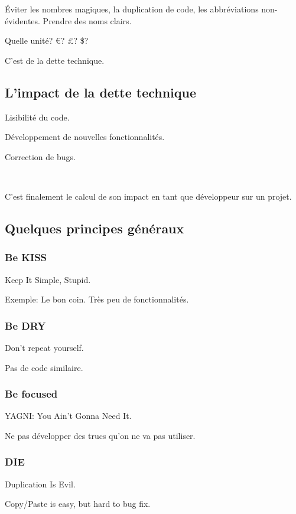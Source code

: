 \documentclass[a4paper,11pt]{article}
\begin{document}
Éviter les nombres magiques, la duplication de code, les abbréviations
non-évidentes. Prendre des noms clairs.

Quelle unité? \euro? £? \$?

C'est de la dette technique.

\subsection{L'impact de la dette technique}

Lisibilité du code.

Développement de nouvelles fonctionnalités.

Correction de bugs.

\

C'est finalement le calcul de son impact en tant que développeur sur un projet.

\subsection{Quelques principes généraux}
\subsubsection{Be KISS}

Keep It Simple, Stupid.

Exemple: Le bon coin. Très peu de fonctionnalités.

\subsubsection{Be DRY}

Don't repeat yourself.

Pas de code similaire.

\subsubsection{Be focused}

YAGNI: You Ain't Gonna Need It.

Ne pas développer des trucs qu'on ne va pas utiliser.

\subsubsection{DIE}

Duplication Is Evil.

Copy/Paste is easy, but hard to bug fix.
\end{document}

